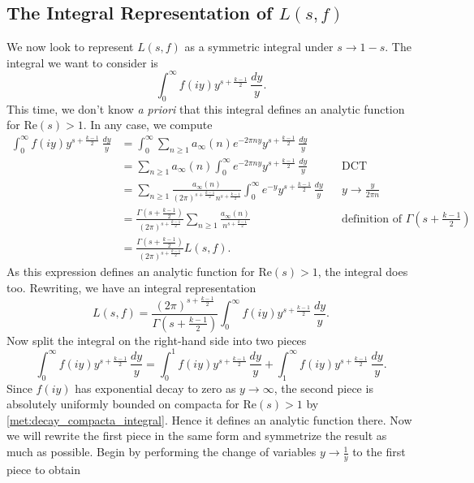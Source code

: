 \documentclass[12pt]{book}
\theoremstyle{definition}\newframedtheorem{method}{Method}
\newcommand{\G}{\Gamma}
\newcommand{\<}{\langle}
\renewcommand{\>}{\rangle}
\renewcommand{\Re}{\mathrm{Re}}
\begin{document}
    \subsection*{The Integral Representation of \texorpdfstring{$L(s,f)$}{L(s,f)}}
      We now look to represent $L(s,f)$ as a symmetric integral under $s \to 1-s$. The integral we want to consider is
      \[
        \int_{0}^{\infty}f(iy)y^{s+\frac{k-1}{2}}\,\frac{dy}{y}.
      \]
      This time, we don't know \textit{a priori} that this integral defines an analytic function for $\Re(s) > 1$. In any case, we compute
      \begin{align*}
        \int_{0}^{\infty}f(iy)y^{s+\frac{k-1}{2}}\,\frac{dy}{y} &= \int_{0}^{\infty}\sum_{n \ge 1}a_{\infty}(n)e^{-2\pi ny}y^{s+\frac{k-1}{2}}\,\frac{dy}{y} \\
        &= \sum_{n \ge 1}a_{\infty}(n)\int_{0}^{\infty}e^{-2\pi ny}y^{s+\frac{k-1}{2}}\,\frac{dy}{y} &&\text{DCT} \\
        &= \sum_{n \ge 1}\frac{a_{\infty}(n)}{(2\pi)^{s+\frac{k-1}{2}}n^{s+\frac{k-1}{2}}}\int_{0}^{\infty}e^{-y}y^{s+\frac{k-1}{2}}\,\frac{dy}{y} &&\text{$y \to \frac{y}{2\pi n}$} \\
        &= \frac{\G(s+\frac{k-1}{2})}{(2\pi)^{s+\frac{k-1}{2}}}\sum_{n \ge 1}\frac{a_{\infty}(n)}{n^{s+\frac{k-1}{2}}} &&\text{definition of $\G\left(s+\frac{k-1}{2}\right)$} \\
        &= \frac{\G(s+\frac{k-1}{2})}{(2\pi)^{s+\frac{k-1}{2}}}L(s,f).
      \end{align*}
      As this expression defines an analytic function for $\Re(s) > 1$, the integral does too. Rewriting, we have an integral representation
      \begin{equation}\label{equ:integral_representation_L-function_1}
        L(s,f) = \frac{(2\pi)^{s+\frac{k-1}{2}}}{\G(s+\frac{k-1}{2})}\int_{0}^{\infty}f(iy)y^{s+\frac{k-1}{2}}\,\frac{dy}{y}.
      \end{equation}
      Now split the integral on the right-hand side into two pieces
      \begin{equation}\label{equ:symmetric_integral_L-function_split}
        \int_{0}^{\infty}f(iy)y^{s+\frac{k-1}{2}}\,\frac{dy}{y} = \int_{0}^{1}f(iy)y^{s+\frac{k-1}{2}}\,\frac{dy}{y}+\int_{1}^{\infty}f(iy)y^{s+\frac{k-1}{2}}\,\frac{dy}{y}.
      \end{equation}
      Since $f(iy)$ has exponential decay to zero as $y \to \infty$, the second piece is absolutely uniformly bounded on compacta for $\Re(s) > 1$ by \cref{met:decay_compacta_integral}. Hence it defines an analytic function there. Now we will rewrite the first piece in the same form and symmetrize the result as much as possible. Begin by performing the change of variables $y \to \frac{1}{y}$ to the first piece to obtain
\end{document}
